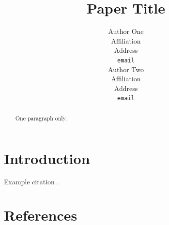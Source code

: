 \documentclass{article}
\title{Paper Title}
\author{%
  Author One \\
  Affiliation \\
  Address \\
  \texttt{email} \\
  \And
  Author Two \\
  Affiliation \\
  Address \\
  \texttt{email} \\
}
\begin{document}
\maketitle

\begin{abstract}
  One paragraph only.
\end{abstract}

\section{Introduction}
Example citation \citep{hasselmo}.

\section*{References}
{\small


}

\newpage

\end{document}
